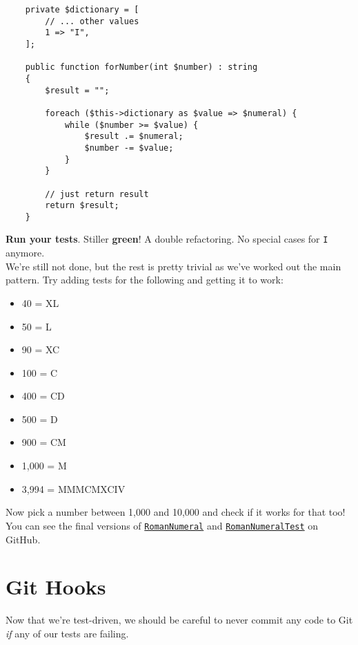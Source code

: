\begin{verbatim}
    private $dictionary = [
        // ... other values
        1 => "I",
    ];

    public function forNumber(int $number) : string
    {
        $result = "";

        foreach ($this->dictionary as $value => $numeral) {
            while ($number >= $value) {
                $result .= $numeral;
                $number -= $value;
            }
        }

        // just return result
        return $result;
    }
\end{verbatim}

\textbf{Run your tests}. Stiller \textbf{green}! A double refactoring. No special cases for \texttt{I} anymore.
\\

We're still not done, but the rest is pretty trivial as we've worked out the main pattern. Try adding tests for the following and getting it to work:

\begin{itemize}
    \item 40 = XL
    \item 50 = L
    \item 90 = XC
    \item 100 = C
    \item 400 = CD
    \item 500 = D
    \item 900 = CM
    \item 1,000 = M
    \item 3,994 = MMMCMXCIV
\end{itemize}

Now pick a number between 1,000 and 10,000 and check if it works for that too!
\\

You can see the final versions of \href{https://github.com/develop-me/bootcamp--laravel-project/blob/develop/app/RomanNumeral.php}{\texttt{RomanNumeral}} and \href{https://github.com/develop-me/bootcamp--laravel-project/blob/develop/tests/Unit/RomanNumeralTest.php}{\texttt{RomanNumeralTest}} on GitHub.


\section{Git Hooks}

Now that we're test-driven, we should be careful to never commit any code to Git \textit{if} any of our tests are failing.
\\

